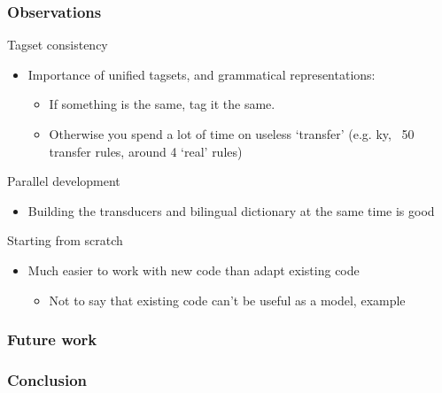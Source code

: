 \documentclass[10pt,xetex]{beamer} %
\begin{document}
\begin{frame}
  \frametitle{Observations}

\begin{block}{Tagset consistency}
  \begin{itemize}
    \item Importance of unified tagsets, and grammatical representations:
    \begin{itemize}
      \item If something is the same, tag it the same.
      \item Otherwise you spend a lot of time on useless `transfer'
        (e.g. ky, ~50 transfer rules, around 4 `real' rules)
    \end{itemize}
  \end{itemize}
\end{block}

\begin{block}{Parallel development}
  \begin{itemize}
    \item Building the transducers and bilingual dictionary at the same time is good
  \end{itemize}
\end{block}

\begin{block}{Starting from scratch}
  \begin{itemize}
    \item Much easier to work with new code than adapt existing code
    \begin{itemize}
      \item Not to say that existing code can't be useful as a model, example
    \end{itemize}
  \end{itemize}
\end{block}

\end{frame}


\begin{frame}
  \frametitle{Future work}

\end{frame}

\begin{frame}
  \frametitle{Conclusion}

\end{frame}
\end{document}
